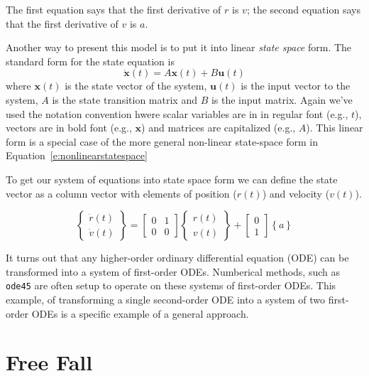 The first equation says that the first derivative of $r$ is $v$;
the second equation says that the first derivative of $v$ is $a$.

Another way to present this model is to put it into linear \emph{state space} form.  The standard form for the state equation is
\begin{equation} \label{e:statespace}
    \dot{\mathbf{x}}(t) = A \mathbf{x}(t) + B \mathbf{u}(t) 
\end{equation}
where $\mathbf{x}(t)$ is the state vector of the system, $\mathbf{u}(t)$ is the input vector to the system, $A$ is the state transition matrix and $B$ is the input matrix.  Again we've used the notation convention hwere scalar variables are in in regular font (e.g., $t$), vectors are in bold font (e.g., $\mathbf{x}$) and matrices are capitalized (e.g., $A$).  This linear form is a special case of the more general non-linear state-space form in Equation~\ref{e:nonlinearstatespace}

To get our system of equations into state space form we can define the state vector as a column vector with elements of position ($r(t)$) and velocity ($v(t)$).

\begin{equation}
\left\lbrace
\begin{array}{c}
    \dot{r}(t) \\
    \dot{v}(t)
\end{array}
\right\rbrace
=
\left[ \begin{array}{cc}
0 & 1 \\
0 & 0 
\end{array} \right]
\left\{ \begin{array}{c}
    r(t) \\ v(t)
\end{array} \right\}
+ 
\left[ \begin{array}{c}
    0 \\ 1
\end{array} \right]
\left\{ a \right\}
\end{equation}

It turns out that any higher-order ordinary differential equation (ODE) can be transformed into a system of first-order ODEs. Numberical methods, such as \lstinline{ode45} are often setup to operate on these systems of first-order ODEs.  This example, of transforming a single second-order ODE into a system of two first-order ODEs is a specific example of a general approach.

\section{Free Fall}
\label{freefall}

